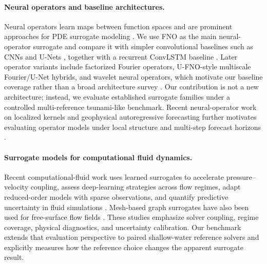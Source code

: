 \paragraph{Neural operators and baseline architectures.}
Neural operators learn maps between function spaces and are prominent approaches for PDE surrogate modeling \citep{li2021fno,kovachki2023neuraloperator}. We use FNO as the main neural-operator surrogate and compare it with simpler convolutional baselines such as CNNs and U-Nets \citep{lecun1998gradient,ronneberger2015unet}, together with a recurrent ConvLSTM baseline \citep{shi2015convlstm}. Later operator variants include factorized Fourier operators, U-FNO-style multiscale Fourier/U-Net hybrids, and wavelet neural operators, which motivate our baseline coverage rather than a broad architecture survey \citep{tran2023ffno,wen2022ufno,tripura2023wno}. Our contribution is not a new architecture; instead, we evaluate established surrogate families under a controlled multi-reference tsunami-like benchmark. Recent neural-operator work on localized kernels and geophysical autoregressive forecasting further motivates evaluating operator models under local structure and multi-step forecast horizons \citep{liu2024localized,pathak2022fourcastnet,hu2025spherical}.

\paragraph{Surrogate models for computational fluid dynamics.}
Recent computational-fluid work uses learned surrogates to accelerate pressure--velocity coupling, assess deep-learning strategies across flow regimes, adapt reduced-order models with sparse observations, and quantify predictive uncertainty in fluid simulations \citep{surrogatePiso2026,streetcanyon2026,romAdapt2026,fluidUQ2026}. Mesh-based graph surrogates have also been used for free-surface flow fields \citep{neuralPFEM2025}. These studies emphasize solver coupling, regime coverage, physical diagnostics, and uncertainty calibration. Our benchmark extends that evaluation perspective to paired shallow-water reference solvers and explicitly measures how the reference choice changes the apparent surrogate result.

